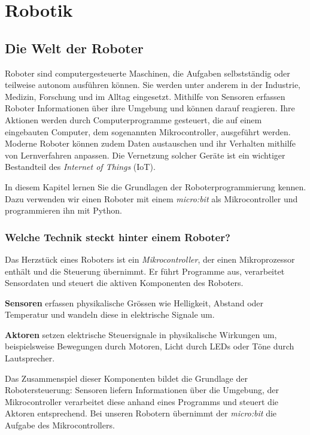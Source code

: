 \chapter{Robotik}
\section{Die Welt der Roboter}\label{ch:K09_Robotik}

Roboter sind computergesteuerte Maschinen, die Aufgaben selbstständig
oder teilweise autonom ausführen können. Sie werden unter anderem in
der Industrie, Medizin, Forschung und im Alltag eingesetzt.
Mithilfe von Sensoren erfassen Roboter Informationen über ihre
Umgebung und können darauf reagieren. Ihre Aktionen werden durch
Computerprogramme gesteuert, die auf einem eingebauten Computer,
dem sogenannten Mikrocontroller, ausgeführt werden.
Moderne Roboter können zudem Daten austauschen und ihr Verhalten
mithilfe von Lernverfahren anpassen. Die Vernetzung solcher Geräte
ist ein wichtiger Bestandteil des \emph{Internet of Things} (IoT).

In diesem Kapitel lernen Sie die Grundlagen der Roboterprogrammierung
kennen. Dazu verwenden wir einen Roboter mit einem \emph{micro:bit}
als Mikrocontroller und programmieren ihn mit Python.


\subsection*{Welche Technik steckt hinter einem Roboter?}

Das Herzstück eines Roboters ist ein \emph{Mikrocontroller},
der einen Mikroprozessor enthält und die Steuerung übernimmt.
Er führt Programme aus, verarbeitet Sensordaten und steuert
die aktiven Komponenten des Roboters.

\begin{mydefinition}
    \textbf{Sensoren} erfassen physikalische Grössen wie
    Helligkeit, Abstand oder Temperatur und wandeln diese
    in elektrische Signale um.

    \textbf{Aktoren} setzen elektrische Steuersignale in
    physikalische Wirkungen um, beispielsweise Bewegungen
    durch Motoren, Licht durch LEDs oder Töne durch Lautsprecher.
\end{mydefinition}

Das Zusammenspiel dieser Komponenten bildet die Grundlage
der Robotersteuerung: Sensoren liefern Informationen über
die Umgebung, der Mikrocontroller verarbeitet diese anhand
eines Programms und steuert die Aktoren entsprechend.
Bei unseren Robotern übernimmt der \emph{micro:bit}
die Aufgabe des Mikrocontrollers.

